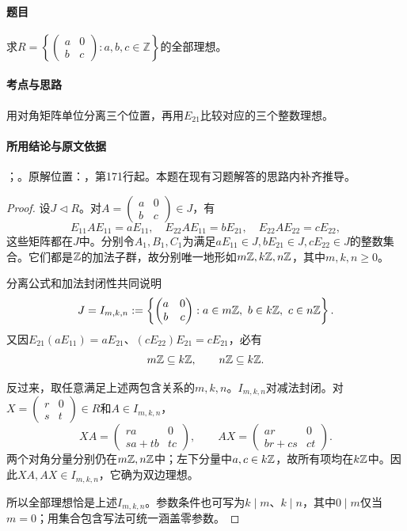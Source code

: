 \paragraph{题目}

求$R=\left\{\begin{pmatrix}a&0\\b&c\end{pmatrix}:a,b,c\in\mathbb Z\right\}$的全部理想。

\paragraph{考点与思路}

用对角矩阵单位分离三个位置，再用$E_{21}$比较对应的三个整数理想。

\paragraph{所用结论与原文依据}

；。原解位置：，第171行起。本题在现有习题解答的思路内补齐推导。


\begin{proof}

设$J\lhd R$。对$A=\left(\begin{smallmatrix}a&0\\b&c\end{smallmatrix}\right)\in J$，有
\[
E_{11}AE_{11}=aE_{11},\quad E_{22}AE_{11}=bE_{21},\quad E_{22}AE_{22}=cE_{22},
\]
这些矩阵都在$J$中。分别令$A_1,B_1,C_1$为满足$aE_{11}\in J,bE_{21}\in J,cE_{22}\in J$的整数集合。它们都是$\mathbb Z$的加法子群，故分别唯一地形如$m\mathbb Z,k\mathbb Z,n\mathbb Z$，其中$m,k,n\ge0$。

分离公式和加法封闭性共同说明
\[
J=I_{m,k,n}:=\left\{\begin{pmatrix}a&0\\b&c\end{pmatrix}:a\in m\mathbb Z,\ b\in k\mathbb Z,\ c\in n\mathbb Z\right\}.
\]
又因$E_{21}(aE_{11})=aE_{21}$、$(cE_{22})E_{21}=cE_{21}$，必有
\[
m\mathbb Z\subseteq k\mathbb Z,\qquad n\mathbb Z\subseteq k\mathbb Z.
\]

反过来，取任意满足上述两包含关系的$m,k,n$。$I_{m,k,n}$对减法封闭。对$X=\left(\begin{smallmatrix}r&0\\s&t\end{smallmatrix}\right)\in R$和$A\in I_{m,k,n}$，
\[
XA=\begin{pmatrix}ra&0\\sa+tb&tc\end{pmatrix},\qquad
AX=\begin{pmatrix}ar&0\\br+cs&ct\end{pmatrix}.
\]
两个对角分量分别仍在$m\mathbb Z,n\mathbb Z$中；左下分量中$a,c\in k\mathbb Z$，故所有项均在$k\mathbb Z$中。因此$XA,AX\in I_{m,k,n}$，它确为双边理想。

所以全部理想恰是上述$I_{m,k,n}$。参数条件也可写为$k\mid m$、$k\mid n$，其中$0\mid m$仅当$m=0$；用集合包含写法可统一涵盖零参数。

\end{proof}

